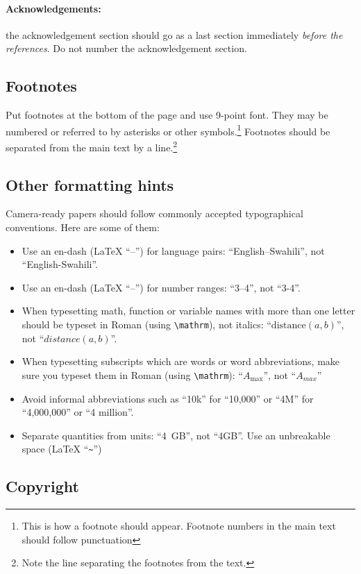 \documentclass[11pt]{article}
\begin{document}
\paragraph{Acknowledgements:} the acknowledgement section should go as a last section immediately
\textit{before the references}.  Do not number the acknowledgement section.

\subsection{Footnotes}

Put footnotes at the bottom of the page and use
9-point font. They may be numbered or referred to by asterisks or
other symbols.\footnote{This is how a footnote should appear. Footnote numbers in the main text should follow punctuation}
Footnotes should be separated from the main text by a
line.\footnote{Note the line separating the footnotes from the text.}

\subsection{Other formatting hints}
Camera-ready papers should follow commonly accepted typographical conventions. Here are some of them:
\begin{itemize}
\item Use an en-dash (\LaTeX{} ``--'') for language pairs: ``English--Swahili'', not ``English-Swahili''.
\item Use an en-dash (\LaTeX{} ``--'') for number ranges: ``3--4'', not ``3-4''.
\item When typesetting math, function or variable names with more than one letter should be typeset in Roman (using \verb|\mathrm|), not italics: ``\(\mathrm{distance}(a,b)\)'', not ``\(distance(a,b)\)''.
\item When typesetting subscripts which are words or word abbreviations, make sure you typeset them in Roman (using \verb|\mathrm|): ``\(A_\mathrm{max}\)'', not ``\(A_{max}\)''
\item Avoid informal abbreviations such as ``10k'' for ``10,000'' or ``4M'' for ``4,000,000'' or ``4 million''.
\item Separate quantities from units: ``4~GB'', not ``4GB''. Use an unbreakable space (\LaTeX{} ``\verb|~|'')
\end{itemize}

\subsection{Copyright}
\end{document}
